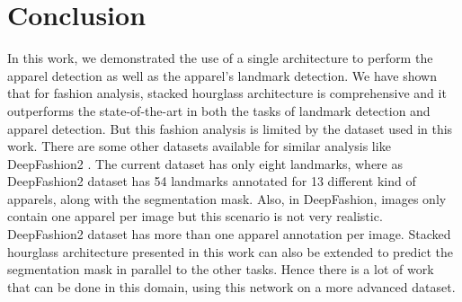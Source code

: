 \documentclass[conference]{IEEEtran}
\begin{document}
\section{Conclusion}
In this work, we demonstrated the use of a single architecture to perform the apparel detection as well as the apparel's landmark detection. We have shown that for fashion analysis, stacked hourglass architecture is comprehensive and it outperforms the state-of-the-art in both the tasks of  landmark detection and apparel detection. But this fashion analysis is limited by the dataset used in this work. There are some other datasets available for similar analysis like DeepFashion2 \cite{DeepFashion2}. The current dataset has only eight landmarks, where as DeepFashion2 dataset has 54 landmarks annotated for 13 different kind of apparels, along with the segmentation mask. Also, in DeepFashion, images only contain one apparel per image but this scenario is not very realistic. DeepFashion2 dataset has more than one apparel annotation per image. Stacked hourglass  architecture presented in this work can also be extended to predict the segmentation mask in parallel to the other tasks. Hence there is a lot of work that can be done in this domain, using this network on a more advanced dataset.


\end{document}
